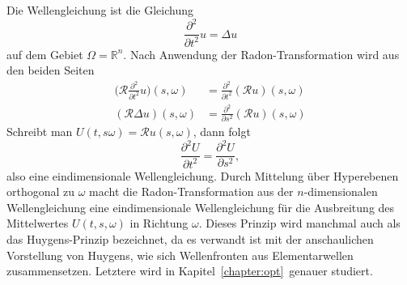 Die Wellengleichung ist die Gleichung
\[
\frac{\partial^2}{\partial t^2}u = \Delta u
\]
auf dem Gebiet $\Omega=\mathbb{R}^n$.
Nach Anwendung der Radon-Transformation wird aus den beiden Seiten
\begin{align*}
\biggl(\mathscr{R}\frac{\partial^2}{\partial t^2}u\biggr)(s,\omega)
&=
\frac{\partial^2}{\partial t^2}(\mathscr{R}u)(s,\omega)
\\
(\mathscr{R}\Delta u)(s,\omega)
&=
\frac{\partial^2}{\partial s^2}(\mathscr{R}u)(s,\omega)
\end{align*}
Schreibt man $U(t,s\omega)=\mathscr{R}u(s,\omega)$, dann folgt
\[
\frac{\partial^2 U}{\partial t^2}
=
\frac{\partial^2 U}{\partial s^2},
\]
also eine eindimensionale Wellengleichung.
Durch Mittelung über Hyperebenen orthogonal zu $\omega$ macht
die Radon-Transformation aus der $n$-dimensionalen Wellengleichung
eine eindimensionale Wellengleichung für die Ausbreitung des
Mittelwertes $U(t,s,\omega)$ in Richtung $\omega$.
Dieses Prinzip wird manchmal auch als das Huygens-Prinzip 
bezeichnet, da es verwandt ist mit der anschaulichen Vorstellung
von Huygens, wie sich Wellenfronten aus Elementarwellen zusammensetzen.
Letztere wird in Kapitel~\ref{chapter:opt} genauer studiert.


